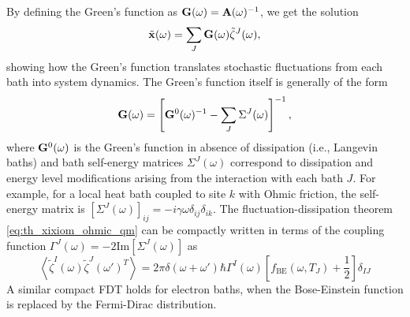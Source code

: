 By defining the Green's function as $\mathbf{G}(\omega)=\mathbf{A}(\omega)^{-1}$, we get the solution 
\begin{equation}
 \tilde{\mathbf{x}}(\omega)  = \sum_J \mathbf{G}(\omega)\tilde \zeta^J(\omega), \label{eq:th_gf_solution}
\end{equation}
showing how the Green's function translates stochastic fluctuations from each bath into system dynamics. The Green's function itself is generally of the form
\begin{equation}
 \mathbf{G}(\omega) = \left[\mathbf{G}^0(\omega)^{-1} - \sum_J \Sigma^J(\omega) \right]^{-1},
\end{equation}
where $\mathbf{G}^0(\omega)$ is the Green's function in absence of dissipation (i.e., Langevin baths) and bath self-energy matrices $\Sigma^J(\omega)$ correspond to dissipation and energy level modifications arising from the interaction with each bath $J$. For example, for a local heat bath coupled to site $k$ with Ohmic friction, the self-energy matrix is $[\Sigma^J(\omega)]_{ij}=-i\gamma \omega \delta_{ij} \delta_{ik}$. The fluctuation-dissipation theorem \eqref{eq:th_xixiom_ohmic_qm} can be compactly written in terms of the coupling function $\Gamma^J(\omega)=-2\textrm{Im}[\Sigma^J(\omega)]$ as 
\begin{equation}
 \left\langle\tilde \zeta^I(\omega)\tilde \zeta^J(\omega')^T \right\rangle = 2\pi \delta(\omega+\omega') \hbar \Gamma^I(\omega) \left[f_{\textrm{BE}}(\omega,T_J)+ \frac{1}{2} \right] \delta_{IJ} \label{eq:th_zetazeta}
\end{equation}
A similar compact FDT holds for electron baths, when the Bose-Einstein function is replaced by the Fermi-Dirac distribution.

